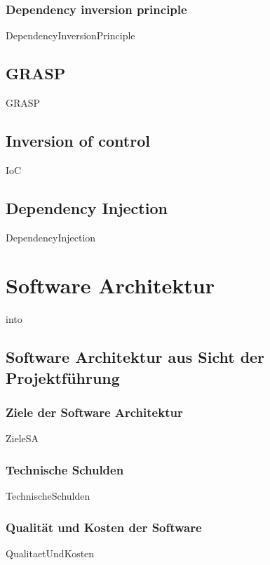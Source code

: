 \documentclass{article}
\begin{document}
        \subsubsection{Dependency inversion principle}
            {DependencyInversionPrinciple}

    \subsection{GRASP}
        {GRASP}

    \subsection{Inversion of control}
    \label{kap:IoC}
        {IoC}
    \subsection{Dependency Injection}
    \label{DependencyInjection}
        {DependencyInjection}

\newpage

\section{Software Architektur}
    {into}

    \subsection{Software Architektur aus Sicht der Projektführung}

        \subsubsection{Ziele der Software Architektur}
            {ZieleSA}
        \subsubsection{Technische Schulden}
            {TechnischeSchulden}

    \newpage
        \subsubsection{Qualität und Kosten der Software}
        \nocite{MF_isHighQuilatySoftwareWorthTheCost}
            {QualitaetUndKosten}
        
\end{document}
